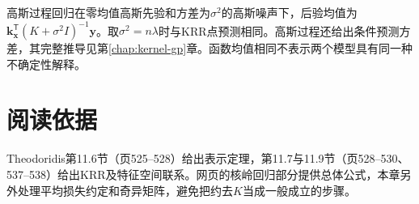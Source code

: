 高斯过程回归在零均值高斯先验和方差为$\sigma^2$的高斯噪声下，后验均值为$\bm k_{\bm x}^{\mathsf T}(K+\sigma^2I)^{-1}\bm y$。取$\sigma^2=n\lambda$时与KRR点预测相同。高斯过程还给出条件预测方差，其完整推导见第\ref{chap:kernel-gp}章。函数均值相同不表示两个模型具有同一种不确定性解释。

\section{阅读依据}
Theodoridis第11.6节（页525--528）给出表示定理，第11.7与11.9节（页528--530、537--538）给出KRR及特征空间联系。网页的核岭回归部分提供总体公式\cite{zheng2021kernel}，本章另外处理平均损失约定和奇异矩阵，避免把约去$K$当成一般成立的步骤。
